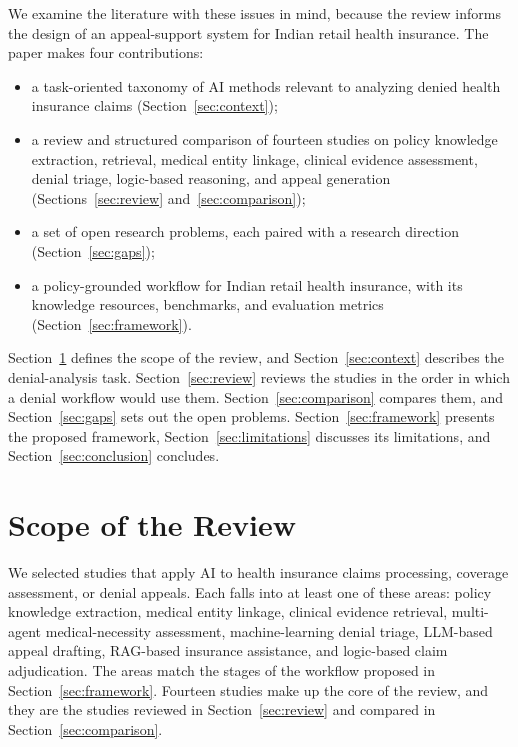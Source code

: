 \documentclass[conference]{IEEEtran}
\begin{document}
We examine the literature with these issues in mind, because the review informs the design of an appeal-support system for Indian retail health insurance. The paper makes four contributions:
\begin{itemize}
    \item a task-oriented taxonomy of AI methods relevant to analyzing denied health insurance claims (Section~\ref{sec:context});
    \item a review and structured comparison of fourteen studies on policy knowledge extraction, retrieval, medical entity linkage, clinical evidence assessment, denial triage, logic-based reasoning, and appeal generation (Sections~\ref{sec:review} and~\ref{sec:comparison});
    \item a set of open research problems, each paired with a research direction (Section~\ref{sec:gaps});
    \item a policy-grounded workflow for Indian retail health insurance, with its knowledge resources, benchmarks, and evaluation metrics (Section~\ref{sec:framework}).
\end{itemize}

Section~\ref{sec:method} defines the scope of the review, and Section~\ref{sec:context} describes the denial-analysis task. Section~\ref{sec:review} reviews the studies in the order in which a denial workflow would use them. Section~\ref{sec:comparison} compares them, and Section~\ref{sec:gaps} sets out the open problems. Section~\ref{sec:framework} presents the proposed framework, Section~\ref{sec:limitations} discusses its limitations, and Section~\ref{sec:conclusion} concludes.

\section{Scope of the Review}
\label{sec:method}
We selected studies that apply AI to health insurance claims processing, coverage assessment, or denial appeals. Each falls into at least one of these areas: policy knowledge extraction, medical entity linkage, clinical evidence retrieval, multi-agent medical-necessity assessment, machine-learning denial triage, LLM-based appeal drafting, RAG-based insurance assistance, and logic-based claim adjudication. The areas match the stages of the workflow proposed in Section~\ref{sec:framework}. Fourteen studies make up the core of the review, and they are the studies reviewed in Section~\ref{sec:review} and compared in Section~\ref{sec:comparison}.
\end{document}
